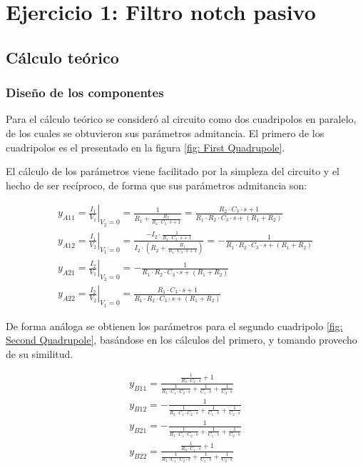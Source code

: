 \section{Ejercicio 1: Filtro notch pasivo}
\subsection{C\'alculo te\'orico}
\subsubsection{Dise\~no de los componentes}
Para el c\'alculo te\'orico se consider\'o al circuito como dos cuadripolos en paralelo, de los cuales se obtuvieron sus par\'ametros admitancia.
El primero de los cuadripolos es el presentado en la figura \ref{fig: First Quadrupole}.


El c\'alculo de los par\'ametros viene facilitado por la simpleza del circuito y el hecho de ser rec\'iproco, de forma que sus par\'ametros admitancia son:

\begin{align}
    \label{eqn: Admittance parameters first quadrupole.}
    y_{A11} = \left. \frac{I_1}{V_1} \right\rvert_{V_2=0} = \frac{1}{R_1 + \frac{R_2}{R_2 \cdot C_3 \cdot s + 1}} = \frac{R_2 \cdot C_3 \cdot s + 1}{R_1 \cdot R_2 \cdot C_3 \cdot s + \left(R_1+R_2\right)} \\
    y_{A12} = \left. \frac{I_1}{V_2} \right\rvert_{V_1=0} = \frac{-I_2 \cdot \frac{1}{R_1 \cdot C_3 \cdot s + 1}}{I_2 \cdot \left(R_2 + \frac{R_1}{R_1 \cdot C_3 \cdot s + 1}\right)} = -\frac{1}{R_1 \cdot R_2 \cdot C_3 \cdot s + \left(R_1+R_2\right)}\\
    y_{A21} = \left. \frac{I_2}{V_1} \right\rvert_{V_2=0} = -\frac{1}{R_1 \cdot R_2 \cdot C_3 \cdot s + \left(R_1+R_2\right)}\\
    y_{A22} = \left. \frac{I_2}{V_2} \right\rvert_{V_1=0} = \frac{R_1 \cdot C_3 \cdot s + 1}{R_1 \cdot R_2 \cdot C_3 \cdot s + \left(R_1+R_2\right)}
\end{align}

De forma an\'aloga se obtienen los par\'ametros para el segundo cuadripolo \ref{fig: Second Quadrupole}, bas\'andose en los c\'alculos del primero, y tomando provecho de su similitud.


\begin{align}
    \label{eqn: Admittance parameters second quadrupole.}
    y_{B11} = \frac{\frac{1}{R_3 \cdot C_2 \cdot s} + 1}{\frac{1}{R_3 \cdot C_1 \cdot C_2 \cdot s} + \frac{1}{C_1 \cdot s} + \frac{1}{C_2 \cdot s}} \\
    y_{B12} = -\frac{1}{\frac{1}{R_3 \cdot C_1 \cdot C_2 \cdot s} + \frac{1}{C_1 \cdot s} + \frac{1}{C_2 \cdot s}}\\
    y_{B21} = -\frac{1}{\frac{1}{R_3 \cdot C_1 \cdot C_2 \cdot s} + \frac{1}{C_1 \cdot s} + \frac{1}{C_2 \cdot s}}\\
    y_{B22} = \frac{\frac{1}{R_3 \cdot C_1 \cdot s} + 1}{\frac{1}{R_3 \cdot C_1 \cdot C_2 \cdot s} + \frac{1}{C_1 \cdot s} + \frac{1}{C_2 \cdot s}}
\end{align}

